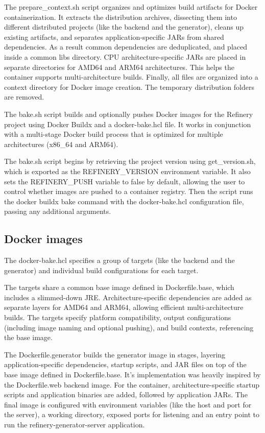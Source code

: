			The prepare\_context.sh script organizes and optimizes build artifacts for Docker containerization. 
			It extracts the distribution archives, dissecting them into different distributed projects (like the backend and the generator), cleans up existing artifacts, 
			and separates application-specific JARs from shared dependencies. As a result common dependencies are deduplicated, and placed inside a common libs directory. 
			CPU architecture-specific JARs are placed in separate directories for AMD64 and ARM64 architectures. 
			This helps the container supports multi-architecture builds.
			Finally, all files are organized into a context directory for Docker image creation. The temporary distribution folders are removed.

			The bake.sh script builds and optionally pushes Docker images for the Refinery project using Docker Buildx and a docker-bake.hcl file. 
			It works in conjunction with a multi-stage Docker build process that is optimized for multiple architectures (x86\_64 and ARM64).

			The bake.sh script begins by retrieving the project version using get\_version.sh, which is exported as the REFINERY\_VERSION environment variable. 
			It also sets the REFINERY\_PUSH variable to false by default, allowing the user to control whether images are pushed to a container registry. 
			Then the script runs the docker buildx bake command with the docker-bake.hcl configuration file, 
			passing any additional arguments.


		\subsection{Docker images}\label{Docker images}
			The docker-bake.hcl specifies a group of targets (like the backend and the generator) and individual build configurations for each target. 

			The targets share a common base image defined in Dockerfile.base, which includes a slimmed-down JRE. 
			Architecture-specific dependencies are added as separate layers for AMD64 and ARM64, allowing efficient multi-architecture builds. 
			The targets specify platform compatibility, output configurations (including image naming and optional pushing), 
			and build contexts, referencing the base image.

			The Dockerfile.generator builds the generator image in stages, layering application-specific dependencies, startup scripts, 
			and JAR files on top of the base image defined in Dockerfile.base. It's implementation was heavily inspired by the Dockerfile.web backend image. 
			For the container, architecture-specific startup scripts and application binaries are added, 
			followed by application JARs. The final image is configured with environment variables (like the host and port for the server),
			a working directory, exposed ports for listening and an entry point to run the refinery-generator-server application.

